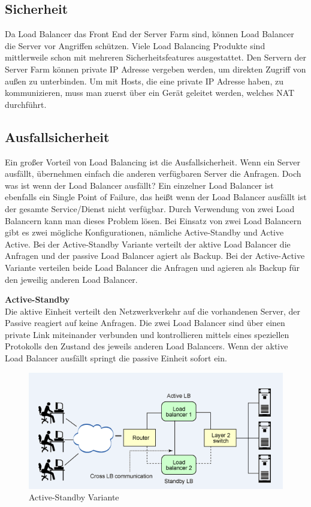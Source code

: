 \subsection{Sicherheit}
\label{sec:Sicherheit}

Da Load Balancer das Front End der Server Farm sind, können Load Balancer die Server vor Angriffen schützen. Viele Load Balancing Produkte sind mittlerweile schon mit mehreren Sicherheitsfeatures ausgestattet. Den Servern der Server Farm können private IP Adresse vergeben werden, um direkten Zugriff von außen zu unterbinden. Um mit Hosts, die eine private IP Adresse haben, zu kommunizieren, muss man zuerst über ein Gerät geleitet werden, welches NAT durchführt. \cite{LoadBalancing2}  

\subsection{Ausfallsicherheit}
\label{sec:Ausfallsicherheit}  
Ein großer Vorteil von Load Balancing ist die Ausfallsicherheit. Wenn ein Server ausfällt, übernehmen einfach die anderen verfügbaren Server die Anfragen. Doch was ist wenn der Load Balancer ausfällt? Ein einzelner Load Balancer ist ebenfalls ein Single Point of Failure, das heißt wenn der Load Balancer ausfällt ist der gesamte Service/Dienst nicht verfügbar. Durch Verwendung von zwei Load Balancern kann man dieses Problem lösen. Bei Einsatz von zwei Load Balancern gibt es zwei mögliche Konfigurationen, nämliche Active-Standby und Active Active. Bei der Active-Standby Variante verteilt der aktive Load Balancer die Anfragen und der passive Load Balancer agiert als Backup. Bei der Active-Active Variante verteilen beide Load Balancer die Anfragen und agieren als Backup für den jeweilig anderen Load Balancer.\vspace{5mm}

\textbf{Active-Standby} \\ 

Die aktive Einheit verteilt den Netzwerkverkehr auf die vorhandenen Server, der Passive reagiert auf keine Anfragen. Die zwei Load Balancer sind über einen private Link miteinander verbunden und kontrollieren mittels eines speziellen Protokolls den Zustand des jeweils anderen Load Balancers. Wenn der aktive Load Balancer ausfällt springt die passive Einheit sofort ein.
\pagebreak
\begin{figure}[!h]
	\begin{center}
		\includegraphics[width=0.6\linewidth]{images/loadbalancing13.png}
		\caption{Active-Standby Variante \cite{LoadBalancingGrafik3}}
		\label{Active-Standby Variante}
	\end{center}
\end{figure}


